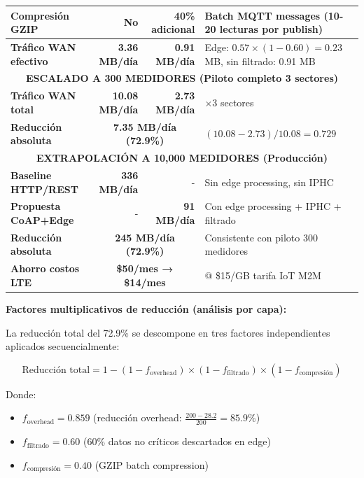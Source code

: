 \begin{table}[H]
{\begin{tabular}{|l|r|r|p{5cm}|}
Compresión GZIP & No & 40\% adicional & Batch MQTT messages (10-20 lecturas por publish) \\
\hline
\rowcolor{blue!20}
\textbf{Tráfico WAN efectivo} & \textbf{3.36 MB/día} & \textbf{0.91 MB/día} & Edge: $0.57 \times (1-0.60) = 0.23$ MB, sin filtrado: 0.91 MB \\
\hline
\multicolumn{4}{|c|}{\textbf{ESCALADO A 300 MEDIDORES (Piloto completo 3 sectores)}} \\
\hline
\rowcolor{green!20}
\textbf{Tráfico WAN total} & \textbf{10.08 MB/día} & \textbf{2.73 MB/día} & $\times 3$ sectores \\
\textbf{Reducción absoluta} & \multicolumn{2}{c|}{\textbf{7.35 MB/día (72.9\%)}} & $(10.08 - 2.73) / 10.08 = 0.729$ \\
\hline
\multicolumn{4}{|c|}{\textbf{EXTRAPOLACIÓN A 10,000 MEDIDORES (Producción)}} \\
\hline
\rowcolor{red!10}
\textbf{Baseline HTTP/REST} & \textbf{336 MB/día} & - & Sin edge processing, sin IPHC \\
\rowcolor{blue!10}
\textbf{Propuesta CoAP+Edge} & - & \textbf{91 MB/día} & Con edge processing + IPHC + filtrado \\
\textbf{Reducción absoluta} & \multicolumn{2}{c|}{\textbf{245 MB/día (72.9\%)}} & Consistente con piloto 300 medidores \\
\textbf{Ahorro costos LTE} & \multicolumn{2}{c|}{\textbf{\$50/mes → \$14/mes}} & @ \$15/GB tarifa IoT M2M \\
\hline
\end{tabular}%
}
\end{table}

\textbf{Factores multiplicativos de reducción (análisis por capa):}

La reducción total del 72.9\% se descompone en tres factores independientes aplicados secuencialmente:

\begin{equation}
\text{Reducción total} = 1 - (1 - f_{\text{overhead}}) \times (1 - f_{\text{filtrado}}) \times (1 - f_{\text{compresión}})
\end{equation}

Donde:
\begin{itemize}
    \item $f_{\text{overhead}} = 0.859$ (reducción overhead: $\frac{200 - 28.2}{200} = 85.9\%$)
    \item $f_{\text{filtrado}} = 0.60$ (60\% datos no críticos descartados en edge)
    \item $f_{\text{compresión}} = 0.40$ (GZIP batch compression)
\end{itemize}

